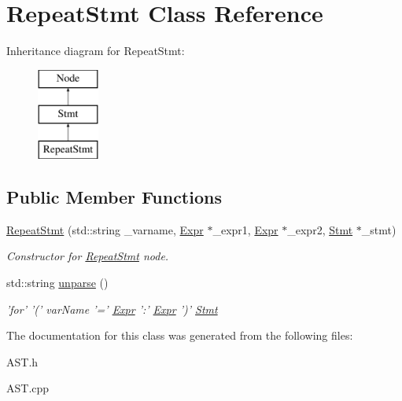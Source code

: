 \hypertarget{classRepeatStmt}{\section{Repeat\-Stmt Class Reference}
\label{classRepeatStmt}
}
Inheritance diagram for Repeat\-Stmt\-:\begin{figure}[H]
\begin{center}
\leavevmode
\includegraphics[height=3.000000cm]{classRepeatStmt}
\end{center}
\end{figure}
\subsection*{Public Member Functions}
\begin{DoxyCompactItemize}
\item 
\hypertarget{classRepeatStmt_a080f13ebf0369f2babc0d14e3c3f2bcf}{\hyperlink{classRepeatStmt_a080f13ebf0369f2babc0d14e3c3f2bcf}{Repeat\-Stmt} (std\-::string \-\_\-varname, \hyperlink{classExpr}{Expr} $\ast$\-\_\-expr1, \hyperlink{classExpr}{Expr} $\ast$\-\_\-expr2, \hyperlink{classStmt}{Stmt} $\ast$\-\_\-stmt)}\label{classRepeatStmt_a080f13ebf0369f2babc0d14e3c3f2bcf}

\begin{DoxyCompactList}\small\item\em Constructor for \hyperlink{classRepeatStmt}{Repeat\-Stmt} node. \end{DoxyCompactList}\item 
\hypertarget{classRepeatStmt_a9ccc876694fd9b60671818bb9c81447e}{std\-::string \hyperlink{classRepeatStmt_a9ccc876694fd9b60671818bb9c81447e}{unparse} ()}\label{classRepeatStmt_a9ccc876694fd9b60671818bb9c81447e}

\begin{DoxyCompactList}\small\item\em 'for' '(' var\-Name '=' \hyperlink{classExpr}{Expr} '\-:' \hyperlink{classExpr}{Expr} ')' \hyperlink{classStmt}{Stmt} \end{DoxyCompactList}\end{DoxyCompactItemize}


The documentation for this class was generated from the following files\-:\begin{DoxyCompactItemize}
\item 
A\-S\-T.\-h\item 
A\-S\-T.\-cpp\end{DoxyCompactItemize}
